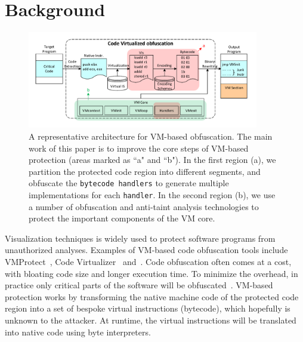 \section{Background}\label{sec:background}
\begin{figure}[!t]
\centering
\includegraphics[width=0.9\textwidth]{fig/vmprotection.pdf}
\caption{A representative architecture for VM-based obfuscation. The main work of this paper is to improve the core steps of VM-based protection (areas marked as ``a" and ``b").
In the first region (a), we partition the protected code region into different segments, and obfuscate the \texttt{bytecode handlers} to generate multiple implementations for each \texttt{handler}.
In the second region (b), we use a number of obfuscation and anti-taint analysis technologies to protect the important components of the VM core.}
\label{fig:vmprotection}
\end{figure}

Visualization techniques is widely used to protect software programs from unauthorized analyses.
Examples of VM-based code obfuscation tools include VMProtect~\cite{vmp}, Code Virtualizer~\cite{cv} and~\cite{Themida}.
Code obfuscation often comes at a cost, with bloating code size and longer execution time.
To minimize the overhead, in practice only critical parts of the software will be obfuscated~\cite{geneiatakis2012adaptive}.
VM-based  protection works by transforming the native machine code of the protected code region into
a set of bespoke virtual instructions (bytecode), which hopefully is unknown to the attacker.
At runtime, the virtual instructions will be translated into native code using byte interpreters.



